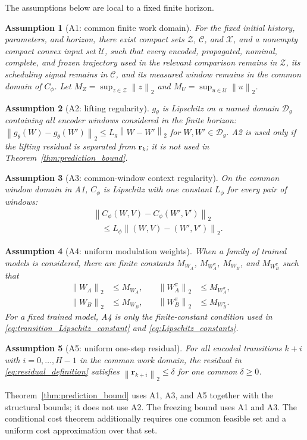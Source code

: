 \documentclass[journal]{IEEEtran}
\newtheorem{assumption}{Assumption}
\newcommand{\vr}{\mathbf{r}}
\newcommand{\norm}[1]{\left\lVert #1\right\rVert}
\begin{document}
The assumptions below are local to a fixed finite horizon.
\begin{assumption}[A1: common finite work domain]
\label{ass:a1}
For the fixed initial history, parameters, and horizon, there exist compact sets $\mathcal Z$, $\mathcal C$, and $\mathcal X$, and a nonempty compact convex input set $\mathcal U$, such that every encoded, propagated, nominal, complete, and frozen trajectory used in the relevant comparison remains in $\mathcal Z$, its scheduling signal remains in $\mathcal C$, and its measured window remains in the common domain of $C_\phi$. Let $M_Z=\sup_{z\in\mathcal Z}\norm{z}_2$ and $M_U=\sup_{u\in\mathcal U}\norm{u}_2$.
\end{assumption}
\begin{assumption}[A2: lifting regularity]
\label{ass:a2}
$g_\theta$ is Lipschitz on a named domain $\mathcal D_g$ containing all encoder windows considered in the finite horizon: $\norm{g_\theta(W)-g_\theta(W')}_2\le L_g\norm{W-W'}_2$ for $W,W'\in\mathcal D_g$. A2 is used only if the lifting residual is separated from $\vr_k$; it is not used in Theorem~\ref{thm:prediction_bound}.
\end{assumption}
\begin{assumption}[A3: common-window context regularity]
\label{ass:a3}
On the common window domain in A1, $C_\phi$ is Lipschitz with one constant $L_\phi$ for every pair of windows:
\begin{equation}
\begin{aligned}
&\norm{C_\phi(W,V)-C_\phi(W',V')}_2\\
&\quad\le L_\phi\norm{(W,V)-(W',V')}_2.
\end{aligned}
\end{equation}
\end{assumption}
\begin{assumption}[A4: uniform modulation weights]
\label{ass:a4}
When a family of trained models is considered, there are finite constants $M_{W_A}$, $M_{W_A^\pi}$, $M_{W_B}$, and $M_{W_B^\pi}$ such that
\begin{equation}
\begin{aligned}
\norm{W_A}_2&\le M_{W_A},\quad &\norm{W_A^\pi}_2&\le M_{W_A^\pi},\quad\\
\norm{W_B}_2&\le M_{W_B},\quad &\norm{W_B^\pi}_2&\le M_{W_B^\pi}.
\end{aligned}
\end{equation}
For a fixed trained model, A4 is only the finite-constant condition used in \eqref{eq:transition_Lipschitz_constant} and \eqref{eq:Lipschitz_constants}.
\end{assumption}
\begin{assumption}[A5: uniform one-step residual]
\label{ass:a5}
For all encoded transitions $k+i$ with $i=0,\ldots,H-1$ in the common work domain, the residual in \eqref{eq:residual_definition} satisfies $\norm{\vr_{k+i}}_2\le\delta$ for one common $\delta\ge0$.
\end{assumption}
Theorem~\ref{thm:prediction_bound} uses A1, A3, and A5 together with the structural bounds; it does not use A2. The freezing bound uses A1 and A3. The conditional cost theorem additionally requires one common feasible set and a uniform cost approximation over that set.
\end{document}
